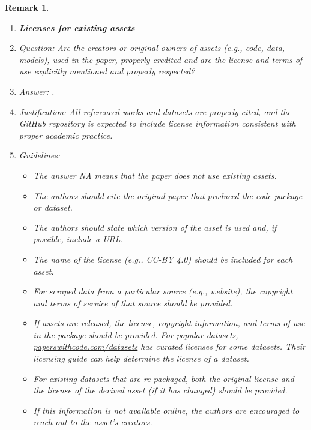 \documentclass{article}
\newtheorem{remark}{Remark}
\begin{document}
\begin{remark}
\begin{enumerate}
\item {\bf Licenses for existing assets}
    \item[] Question: Are the creators or original owners of assets (e.g., code, data, models), used in the paper, properly credited and are the license and terms of use explicitly mentioned and properly respected?
    \item[] Answer: \answerYes{}.
    \item[] Justification: All referenced works and datasets are properly cited, and the GitHub repository is expected to include license information consistent with proper academic practice.
    \item[] Guidelines:
    \begin{itemize}
        \item The answer NA means that the paper does not use existing assets.
        \item The authors should cite the original paper that produced the code package or dataset.
        \item The authors should state which version of the asset is used and, if possible, include a URL.
        \item The name of the license (e.g., CC-BY 4.0) should be included for each asset.
        \item For scraped data from a particular source (e.g., website), the copyright and terms of service of that source should be provided.
        \item If assets are released, the license, copyright information, and terms of use in the package should be provided. For popular datasets, \url{paperswithcode.com/datasets} has curated licenses for some datasets. Their licensing guide can help determine the license of a dataset.
        \item For existing datasets that are re-packaged, both the original license and the license of the derived asset (if it has changed) should be provided.
        \item If this information is not available online, the authors are encouraged to reach out to the asset's creators.
    \end{itemize}


\end{enumerate}
\end{remark}
\end{document}
